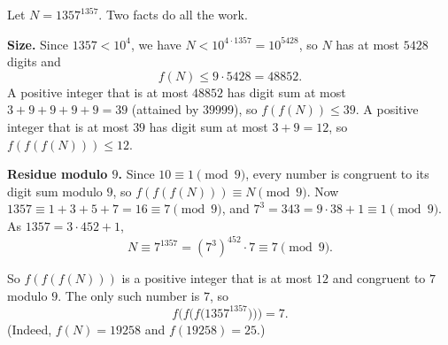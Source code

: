 Let $N=1357^{1357}$. Two facts do all the work.

\textbf{Size.} Since $1357<10^4$, we have $N<10^{4\cdot1357}=10^{5428}$, so $N$ has at most $5428$ digits and
\[
f(N)\le9\cdot5428=48852 .
\]
A positive integer that is at most $48852$ has digit sum at most $3+9+9+9+9=39$ (attained by $39999$), so $f(f(N))\le39$. A positive integer that is at most $39$ has digit sum at most $3+9=12$, so $f(f(f(N)))\le12$.

\textbf{Residue modulo $9$.} Since $10\equiv1\pmod9$, every number is congruent to its digit sum modulo $9$, so $f(f(f(N)))\equiv N\pmod9$. Now $1357\equiv1+3+5+7=16\equiv7\pmod9$, and $7^3=343=9\cdot38+1\equiv1\pmod9$. As $1357=3\cdot452+1$,
\[
N\equiv7^{1357}=\left(7^3\right)^{452}\cdot7\equiv7\pmod9 .
\]

So $f(f(f(N)))$ is a positive integer that is at most $12$ and congruent to $7$ modulo $9$. The only such number is $7$, so
\[
f\bigl(f\bigl(f\bigl(1357^{1357}\bigr)\bigr)\bigr)=\boxed{7}.
\]
(Indeed, $f(N)=19258$ and $f(19258)=25$.)
